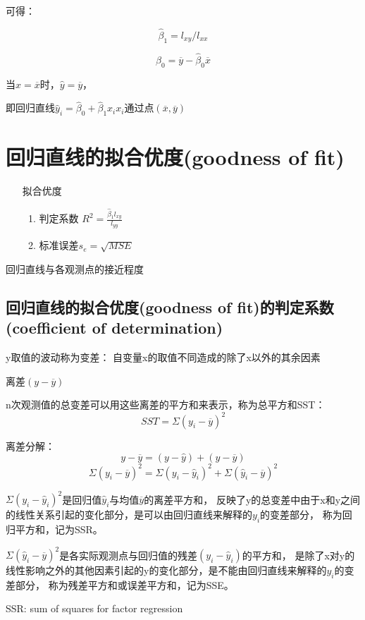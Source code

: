 \documentclass[UTF8,10pt]{book}
\begin{document}
可得： 

$$ \hat{\beta}_1 = l_{xy} / l_{xx} $$ 

$$ \hat{\beta}_0 = \overline{y} - \hat{\beta}_0 \overline{x} $$ 

当$x=\overline{x}$时，$\hat{y}=\overline{y}$，

即回归直线$\hat{y}_i=\hat{\beta}_0+\hat{\beta}_1 x_i x_i$通过点$(\overline{x},\overline{y})$


\section{回归直线的拟合优度(goodness of fit)}	

\begin{itemize}
	\item [拟合优度] {
		\begin{enumerate}
			\item 判定系数 $R^2 = \frac{\hat{\beta}_1 l_{x y }}{l_{y y}}$
			\item 标准误差$s_e = \sqrt{MSE} $
		\end{enumerate}
	}
\end{itemize}

回归直线与各观测点的接近程度
\subsection{回归直线的拟合优度(goodness of fit)的判定系数(coefficient of determination)}	
y取值的波动称为变差： 自变量x的取值不同造成的除了x以外的其余因素 

离差$(y-\overline{y})$ 

n次观测值的总变差可以用这些离差的平方和来表示，称为总平方和SST： 
$$SST = \Sigma(y_i - \overline{y})^2$$ 

离差分解： 
$$ y-\overline{y} = (y-\hat{y})+(\hat{y}-\overline{y}) $$ 
$$ \Sigma (y_i-\overline{y})^2 = \Sigma (y_i-\hat{y}_i)^2+\Sigma(\hat{y}_i-\overline{y})^2 $$ 

$\Sigma (y_i-\hat{y}_i)^2$是回归值$\hat{y}_i$与均值$\overline{y}$的离差平方和，
反映了y的总变差中由于x和y之间的线性关系引起的变化部分，是可以由回归直线来解释的$y_i$的变差部分，
称为回归平方和，记为SSR。

$\Sigma(\hat{y}_i-\overline{y})^2 $是各实际观测点与回归值的残差$(y_i-\hat{y}_i)$的平方和，
是除了x对y的线性影响之外的其他因素引起的y的变化部分，是不能由回归直线来解释的$y_i$的变差部分，
称为残差平方和或误差平方和，记为SSE。

SSR: sum of squares for factor regression
\end{document}
